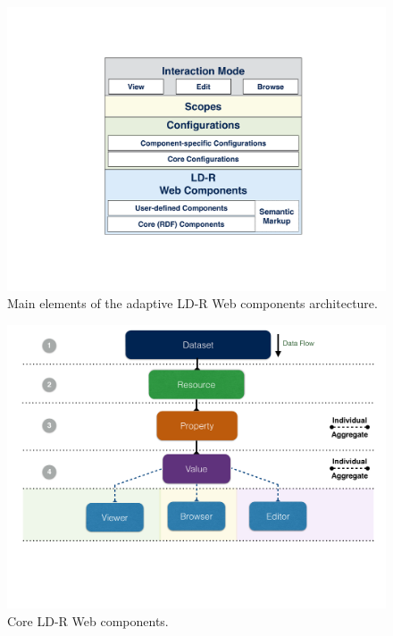 \documentclass{acm_proc_article-sp}
\begin{document}
\begin{figure}[htb]
	\center
  \includegraphics[width=0.80\linewidth]{images/framework.pdf}
  \caption{Main elements of the adaptive LD-R Web components architecture.}
  \label{fig:framework}
\end{figure}

\begin{figure}[htb]
  \includegraphics[width=1\linewidth]{images/architecture.pdf}
  \caption{Core LD-R Web components.}
  \label{fig:architecture}
\end{figure}
\end{document}
